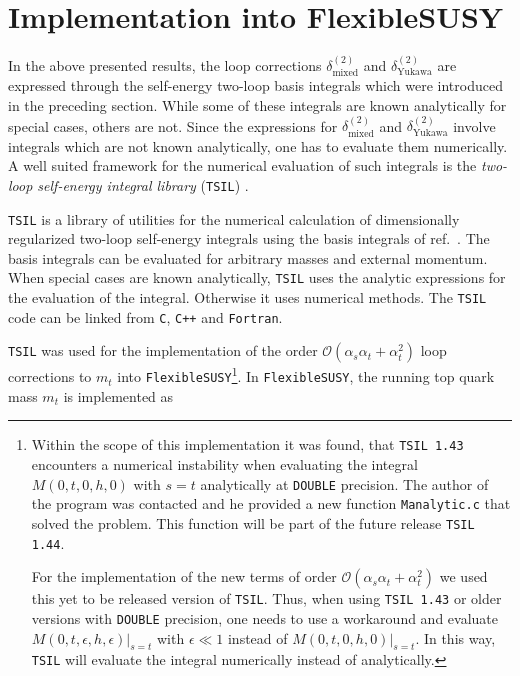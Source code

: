 \documentclass[a4paper,12pt]{book}
\begin{document}
\section{Implementation into FlexibleSUSY}
\label{sec::implementation}
In the above presented results, the loop corrections $\delta^{(2)}_\text{mixed}$ and $\delta^{(2)}_\text{Yukawa}$ are expressed through the self-energy two-loop basis integrals which were introduced in the preceding section. While some of these integrals are known analytically for special cases, others are not. Since the expressions for $\delta^{(2)}_\text{mixed}$ and $\delta^{(2)}_\text{Yukawa}$ involve integrals which are not known analytically, one has to evaluate them numerically. A well suited framework for the numerical evaluation of such integrals is the \textit{two-loop self-energy integral library} (\texttt{TSIL}) \cite{tsil}.\par
\texttt{TSIL} is a library of utilities for the numerical calculation of dimensionally regularized two-loop self-energy integrals using the basis integrals of ref.\ \cite{tarasov}. The basis integrals can be evaluated for arbitrary masses and external momentum. When special cases are known analytically, \texttt{TSIL} uses the analytic expressions for the evaluation of the integral. Otherwise it uses numerical methods. The \texttt{TSIL} code can be linked from \texttt{C}, \texttt{C++} and \texttt{Fortran}.\par
\texttt{TSIL} was used for the implementation of the order $\mathcal{O}(\alpha_s\alpha_t+\alpha_t^2)$ loop corrections to $m_t$ into \texttt{FlexibleSUSY}\footnote{Within the scope of this implementation it was found, that \texttt{TSIL 1.43} encounters a numerical instability when evaluating the integral $M(0,t,0,h,0)$ with $s=t$ analytically at \texttt{DOUBLE} precision. The author of the program was contacted and he provided a new function \texttt{Manalytic.c} that solved the problem. This function will be part of the future release \texttt{TSIL 1.44}.\par
For the implementation of the new terms of order $\mathcal{O}(\alpha_s\alpha_t+\alpha_t^2)$ we used this yet to be released version of \texttt{TSIL}. Thus, when using \texttt{TSIL 1.43} or older versions with \texttt{DOUBLE} precision, one needs to use a workaround and evaluate $M(0,t,\epsilon,h,\epsilon)|_{s=t}$ with $\epsilon \ll 1$ instead of $M(0,t,0,h,0)|_{s=t}$. In this way, \texttt{TSIL} will evaluate the integral numerically instead of analytically.}. In \texttt{FlexibleSUSY}, the running top quark mass $m_t$ is implemented as
\end{document}
